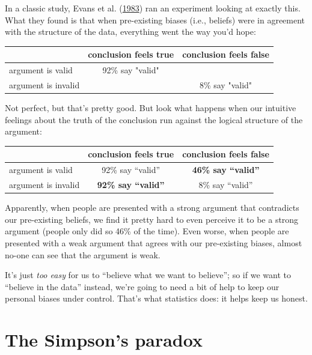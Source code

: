 \documentclass[
  11pt,
]{book}
\theoremstyle{indenteddefinition}
\theoremstyle{indenteddefinition}
\theoremstyle{definition}
\theoremstyle{definition}
\theoremstyle{remark}
\begin{document}
In a classic study, Evans et al. (\protect\hyperlink{ref-Evans1983}{1983}) ran an experiment looking at exactly this. What they found is that when pre-existing biases (i.e., beliefs) were in agreement with the structure of the data, everything went the way you'd hope:

\begin{table}[H]
\centering
\begin{tabular}{lcc}
\toprule
  & conclusion feels true & conclusion feels false\\
\midrule
argument is valid & 92\% say "valid" & \\
argument is invalid &  & 8\% say "valid"\\
\bottomrule
\end{tabular}
\end{table}

Not perfect, but that's pretty good. But look what happens when our intuitive feelings about the truth of the conclusion run against the logical structure of the argument:

\begin{longtable}[]{@{}lcc@{}}
\toprule()
& conclusion feels true & conclusion feels false \\
\midrule()
\endhead
argument is valid & 92\% say ``valid'' & \textbf{46\% say ``valid''} \\
argument is invalid & \textbf{92\% say ``valid''} & 8\% say ``valid'' \\
\bottomrule()
\end{longtable}

Apparently, when people are presented with a strong argument that contradicts our pre-existing beliefs, we find it pretty hard to even perceive it to be a strong argument (people only did so 46\% of the time). Even worse, when people are presented with a weak argument that agrees with our pre-existing biases, almost no-one can see that the argument is weak.

It's just \emph{too easy} for us to ``believe what we want to believe''; so if we want to ``believe in the data'' instead, we're going to need a bit of help to keep our personal biases under control. That's what statistics does: it helps keep us honest.

\pagebreak[3]

\hypertarget{the-simpsons-paradox}{%
\section{The Simpson's paradox}\label{the-simpsons-paradox}}
\end{document}
